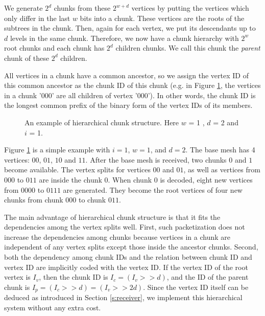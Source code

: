     We generate $2^d$ chunks from these $2^{w+d}$ vertices 
    by putting the vertices which only differ in the last $w$ bits
    into a chunk. These vertices are the roots of the subtrees in the chunk.
    Then, again for each vertex, we put its descendants up to $d$
    levels
    in the same chunk.  Therefore, we now have a chunk hierarchy with $2^{w}$
    root chunks and each chunk has $2^{d}$ children chunks.
    We call this chunk the 
    \textit{parent} chunk of these $2^{d}$ children.
    
    All vertices in a chunk have a common ancestor, so we 
    assign the vertex ID of this common ancestor as the chunk
    ID of this chunk (e.g. in Figure \ref{f:packetize}, the vertices
    in a chunk '000' are all children of vertex '000').
    In other words, the chunk ID is the longest common prefix
    of the binary form of the vertex IDs of its members.

   \begin{figure}[t]
    \centering
    \caption{An example of hierarchical chunk structure. Here $w$ = 1 , $d$ = 2
    and $i$ = 1. 
    \label{f:packetize}}
    \end{figure}
    Figure \ref{f:packetize} is a simple example with 
    $i=1$, $w = 1$, and $d = 2$. The base mesh has 4 vertices: 
    $00$, $01$, $10$ and $11$. 
    After the base mesh is received, two chunks $0$ and $1$ become
    available. 
    The vertex splits for vertices $00$ and $01$, as well as vertices from $000$ to $011$ 
    are inside the chunk $0$. 
    When chunk $0$ is decoded, %
    eight new vertices from $0000$ to $0111$ are generated. 
    They become the root vertices of four new chunks from chunk $000$ to 
    chunk $011$.%
    
    The main advantage of hierarchical chunk structure %
    is that it fits the dependencies among the vertex splits
    well.
    First, such packetization does not increase the dependencies
    among chunks because 
    vertices in a chunk are independent of any vertex splits except
    those inside the ancestor chunks.
    Second, both the dependency among chunk IDs and the relation between
    chunk ID and vertex ID are implicitly 
    coded with the vertex ID.  
    If the vertex ID of the root vertex is $I_v$, 
    then the chunk ID is
    $I_c = (I_v >> d)$, 
    and the ID of the parent chunk is
    $I_p = (I_c >> d) = (I_v >> 2d).$
    Since the vertex ID itself can be deduced as introduced in
    Section \ref{s:receiver}, we implement this hierarchical system without any extra cost.

